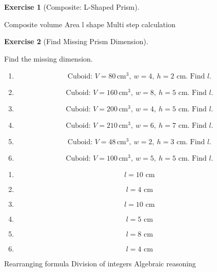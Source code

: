 \documentclass[
  letterpaper,
  DIV=11,
  numbers=noendperiod]{scrreprt}
\theoremstyle{definition}
\newtheorem{exercise}{Exercise}[chapter]
\theoremstyle{remark}
\begin{document}
\begin{exercise}[Composite: L-Shaped
Prism]
\begin{tcolorbox}
\end{tcolorbox}

{Composite volume} {Area l shape} {Multi step calculation}

\end{exercise}

\begin{exercise}[Find Missing Prism
Dimension]\protect\hypertarget{exr-comp-7}{}\label{exr-comp-7}

Find the missing dimension.

\begin{enumerate}
\def\labelenumi{\alph{enumi})}
\item
  \[\text{Cuboid: }V=80\,\text{cm}^{3},\ w=4,\ h=2\text{ cm. Find }l.\]
\item
  \[\text{Cuboid: }V=160\,\text{cm}^{3},\ w=8,\ h=5\text{ cm. Find }l.\]
\item
  \[\text{Cuboid: }V=200\,\text{cm}^{3},\ w=4,\ h=5\text{ cm. Find }l.\]
\item
  \[\text{Cuboid: }V=210\,\text{cm}^{3},\ w=6,\ h=7\text{ cm. Find }l.\]
\item
  \[\text{Cuboid: }V=48\,\text{cm}^{3},\ w=2,\ h=3\text{ cm. Find }l.\]
\item
  \[\text{Cuboid: }V=100\,\text{cm}^{3},\ w=5,\ h=5\text{ cm. Find }l.\]
\end{enumerate}

\begin{tcolorbox}[enhanced jigsaw, opacitybacktitle=0.6, coltitle=black, arc=.35mm, colframe=quarto-callout-tip-color-frame, colback=white, bottomrule=.15mm, left=2mm, colbacktitle=quarto-callout-tip-color!10!white, titlerule=0mm, opacityback=0, title=\textcolor{quarto-callout-tip-color}{\faLightbulb}\hspace{0.5em}{🔍 View Solution}, leftrule=.75mm, breakable, rightrule=.15mm, bottomtitle=1mm, toptitle=1mm, toprule=.15mm]

\begin{enumerate}
\def\labelenumi{\alph{enumi})}
\item
  \[l=10\text{ cm}\]
\item
  \[l=4\text{ cm}\]
\item
  \[l=10\text{ cm}\]
\item
  \[l=5\text{ cm}\]
\item
  \[l=8\text{ cm}\]
\item
  \[l=4\text{ cm}\]
\end{enumerate}

\end{tcolorbox}

{Rearranging formula} {Division of integers} {Algebraic reasoning}

\end{exercise}
\end{document}
